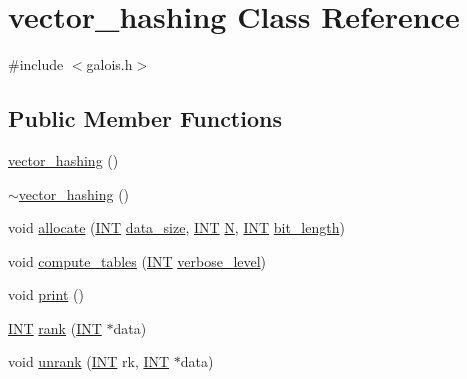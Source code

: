 \hypertarget{classvector__hashing}{}\section{vector\+\_\+hashing Class Reference}
\label{classvector__hashing}


{\ttfamily \#include $<$galois.\+h$>$}

\subsection*{Public Member Functions}
\begin{DoxyCompactItemize}
\item 
\mbox{\hyperlink{classvector__hashing_af8767f6698600d3345811561be2116ed}{vector\+\_\+hashing}} ()
\item 
\mbox{\hyperlink{classvector__hashing_aa34aecaccd6399ffa4c66d5c12a28ee8}{$\sim$vector\+\_\+hashing}} ()
\item 
void \mbox{\hyperlink{classvector__hashing_a1324d458f4b77fce47b0048dc7f1aadd}{allocate}} (\mbox{\hyperlink{galois_8h_a09fddde158a3a20bd2dcadb609de11dc}{I\+NT}} \mbox{\hyperlink{classvector__hashing_aefd29dfc01954a81db98b4ccc954a02f}{data\+\_\+size}}, \mbox{\hyperlink{galois_8h_a09fddde158a3a20bd2dcadb609de11dc}{I\+NT}} \mbox{\hyperlink{classvector__hashing_a174054232bce7c4397fd94327711a8f3}{N}}, \mbox{\hyperlink{galois_8h_a09fddde158a3a20bd2dcadb609de11dc}{I\+NT}} \mbox{\hyperlink{classvector__hashing_a2bfeff3ce35d212013ef702fd207849b}{bit\+\_\+length}})
\item 
void \mbox{\hyperlink{classvector__hashing_aa80d25dc4d37520e54e4e8d664d665e6}{compute\+\_\+tables}} (\mbox{\hyperlink{galois_8h_a09fddde158a3a20bd2dcadb609de11dc}{I\+NT}} \mbox{\hyperlink{simeon_8_c_a818073fbcc2f439e7c56952f67386122}{verbose\+\_\+level}})
\item 
void \mbox{\hyperlink{classvector__hashing_a4954caab83535e063633dd5d27a564c5}{print}} ()
\item 
\mbox{\hyperlink{galois_8h_a09fddde158a3a20bd2dcadb609de11dc}{I\+NT}} \mbox{\hyperlink{classvector__hashing_a4879796cc2ade5fcef891747909ec710}{rank}} (\mbox{\hyperlink{galois_8h_a09fddde158a3a20bd2dcadb609de11dc}{I\+NT}} $\ast$data)
\item 
void \mbox{\hyperlink{classvector__hashing_abbebd3a96a6d27a34b9b49af99e2ed3d}{unrank}} (\mbox{\hyperlink{galois_8h_a09fddde158a3a20bd2dcadb609de11dc}{I\+NT}} rk, \mbox{\hyperlink{galois_8h_a09fddde158a3a20bd2dcadb609de11dc}{I\+NT}} $\ast$data)
\end{DoxyCompactItemize}
